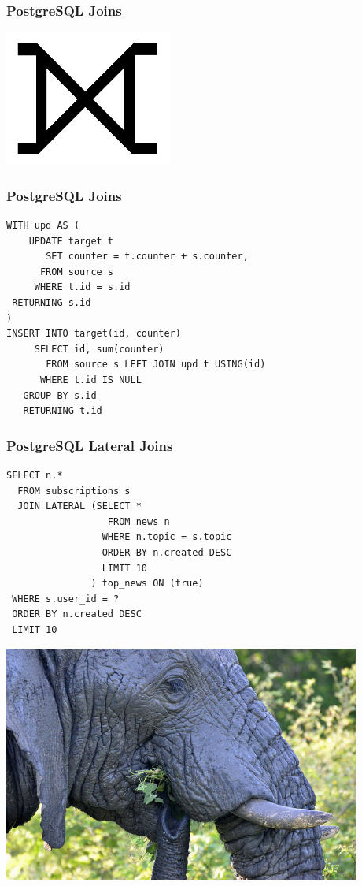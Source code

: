 \documentclass{beamer}
\begin{document}
\begin{frame}
  \frametitle{PostgreSQL Joins}

  \begin{center}
    \includegraphics[height=12em]{huge-full-outer-join.jpg}
  \end{center}
\end{frame}

\begin{frame}[fragile]
  \frametitle{PostgreSQL Joins}

  \begin{verbatim}
WITH upd AS (
    UPDATE target t
       SET counter = t.counter + s.counter,
      FROM source s
     WHERE t.id = s.id
 RETURNING s.id
)
INSERT INTO target(id, counter)
     SELECT id, sum(counter)
       FROM source s LEFT JOIN upd t USING(id)
      WHERE t.id IS NULL
   GROUP BY s.id
   RETURNING t.id
  \end{verbatim}
\end{frame}

\begin{frame}[fragile]
  \frametitle{PostgreSQL Lateral Joins}

  \vfill
  
  \begin{verbatim}
SELECT n.*
  FROM subscriptions s
  JOIN LATERAL (SELECT *
                  FROM news n
                 WHERE n.topic = s.topic
                 ORDER BY n.created DESC
                 LIMIT 10
               ) top_news ON (true)
 WHERE s.user_id = ?
 ORDER BY n.created DESC
 LIMIT 10
  \end{verbatim}
\end{frame}
 
\begin{frame}
  \begin{center}
    \includegraphics[height=21em]{postgresql-mongodb.jpg}
  \end{center}
\end{frame}
\end{document}

